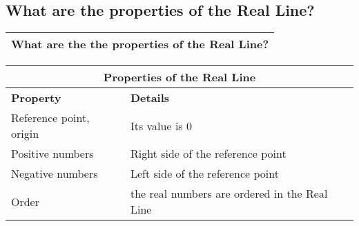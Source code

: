 \subsection{What are the properties of the Real Line?}

\begin{small}
    \begin{tabularx}{1\textwidth}{
            p{}
        }
        \toprule
        \textbf{What are the the properties of the Real Line?} \\
        \bottomrule
    \end{tabularx}
\end{small}

\begin{small}
\begin{tabularx}{1\textwidth}{
        p{}
        p{}
    }
    \toprule
    \multicolumn{2}{c}{\textbf{Properties of the Real Line}} \\
    \midrule

    \textbf{Property} & \textbf{Details}\\
    \midrule

    Reference point, origin & Its value is $0$ \\
    \midrule

    Positive numbers & Right side of the reference point \\
    \midrule

    Negative numbers & Left side of the reference point \\
    \midrule

    Order & the real numbers are ordered in the Real Line \\
    \bottomrule

\end{tabularx}
\end{small}
